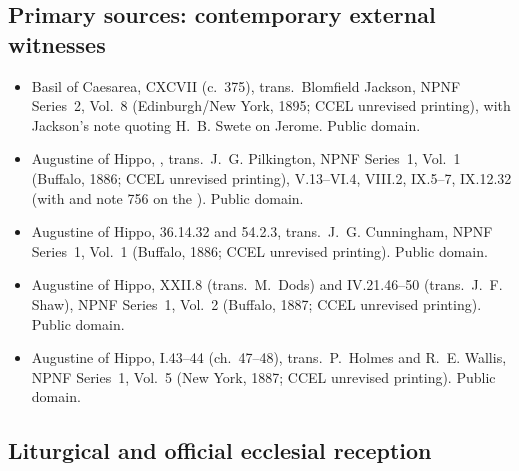 \subsection*{Primary sources: contemporary external witnesses}

\begin{itemize}
\item Basil of Caesarea,  CXCVII (c.~375), trans.\ Blomfield Jackson, NPNF Series~2, Vol.~8 (Edinburgh/New York, 1895; CCEL unrevised printing), with Jackson's note quoting H.~B. Swete on Jerome. Public domain.
\item Augustine of Hippo, , trans.\ J.~G. Pilkington, NPNF Series~1, Vol.~1 (Buffalo, 1886; CCEL unrevised printing), V.13--VI.4, VIII.2, IX.5--7, IX.12.32 (with  and note 756 on the ). Public domain.
\item Augustine of Hippo,  36.14.32 and 54.2.3, trans.\ J.~G. Cunningham, NPNF Series~1, Vol.~1 (Buffalo, 1886; CCEL unrevised printing). Public domain.
\item Augustine of Hippo,  XXII.8 (trans.\ M.~Dods) and  IV.21.46--50 (trans.\ J.~F. Shaw), NPNF Series~1, Vol.~2 (Buffalo, 1887; CCEL unrevised printing). Public domain.
\item Augustine of Hippo,  I.43--44 (ch.~47--48), trans.\ P.~Holmes and R.~E. Wallis, NPNF Series~1, Vol.~5 (New York, 1887; CCEL unrevised printing). Public domain.
\end{itemize}

\subsection*{Liturgical and official ecclesial reception}

